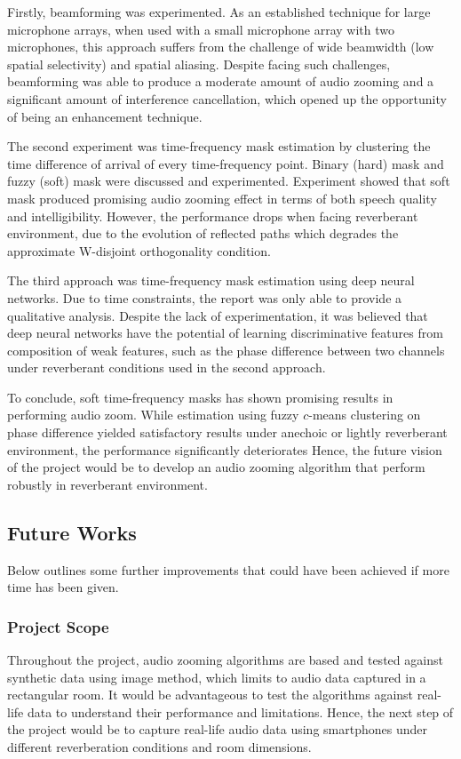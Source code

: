 \documentclass[a4paper,twoside,12pt,hidelinks]{article}
\begin{document}
Firstly, beamforming was experimented. As an established technique for large microphone arrays, when used with a small microphone array with two microphones, this approach suffers from the challenge of wide beamwidth (low spatial selectivity) and spatial aliasing. Despite facing such challenges, beamforming was able to produce a moderate amount of audio zooming and a significant amount of interference cancellation, which opened up the opportunity of being an enhancement technique.

The second experiment was time-frequency mask estimation by clustering the time difference of arrival of every time-frequency point. Binary (hard) mask and fuzzy (soft) mask were discussed and experimented. Experiment showed that soft mask produced promising audio zooming effect in terms of both speech quality and intelligibility. However, the performance drops when facing reverberant environment, due to the evolution of reflected paths which degrades the approximate W-disjoint orthogonality condition.

The third approach was time-frequency mask estimation using deep neural networks. Due to time constraints, the report was only able to provide a qualitative analysis. Despite the lack of experimentation, it was believed that deep neural networks have the potential of learning discriminative features from composition of weak features, such as the phase difference between two channels under reverberant conditions used in the second approach.

To conclude, soft time-frequency masks has shown promising results in performing audio zoom. While estimation using fuzzy $c$-means clustering on phase difference yielded satisfactory results under anechoic or lightly reverberant environment, the performance significantly deteriorates  Hence, the future vision of the project would be to develop an audio zooming algorithm that perform robustly in reverberant environment.

\subsection{Future Works}
\label{sect:futureworks}
Below outlines some further improvements that could have been achieved if more time has been given.
\subsubsection{Project Scope}
Throughout the project, audio zooming algorithms are based and tested against synthetic data using image method, which limits to audio data captured in a rectangular room. It would be advantageous to test the algorithms against real-life data to understand their performance and limitations. Hence, the next step of the project would be to capture real-life audio data using smartphones under different reverberation conditions and room dimensions.
\end{document}
